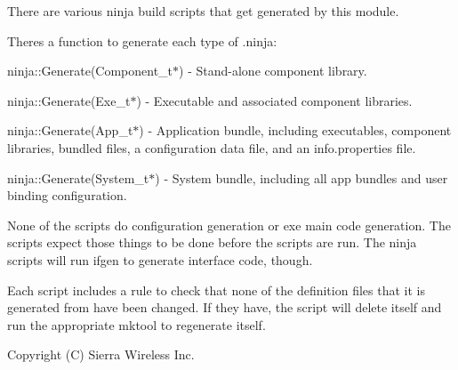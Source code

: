 There are various ninja build scripts that get generated by this module.

There\textquotesingle{}s a function to generate each type of .ninja\+:


\begin{DoxyItemize}
\item ninja\+::\+Generate(\+Component\+\_\+t$\ast$) -\/ Stand-\/alone component library.
\item ninja\+::\+Generate(\+Exe\+\_\+t$\ast$) -\/ Executable and associated component libraries.
\item ninja\+::\+Generate(\+App\+\_\+t$\ast$) -\/ Application bundle, including executables, component libraries, bundled files, a configuration data file, and an info.\+properties file.
\item ninja\+::\+Generate(\+System\+\_\+t$\ast$) -\/ System bundle, including all app bundles and user binding configuration.
\end{DoxyItemize}

None of the scripts do configuration generation or exe main code generation. The scripts expect those things to be done before the scripts are run. The ninja scripts will run ifgen to generate interface code, though.

Each script includes a rule to check that none of the definition files that it is generated from have been changed. If they have, the script will delete itself and run the appropriate mktool to regenerate itself.





Copyright (C) Sierra Wireless Inc. 